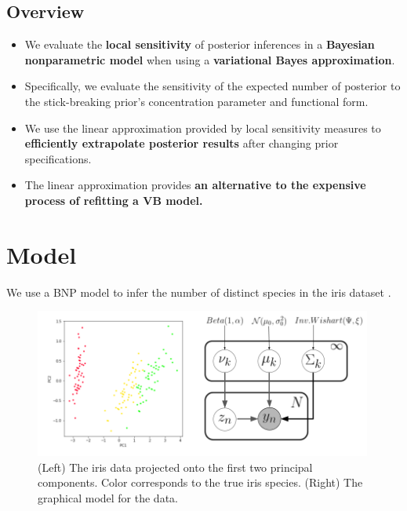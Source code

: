 \documentclass[a0,plainsections]{sciposter}\usepackage[]{graphicx}\usepackage[]{color}
\begin{document}
\begin{minipage}[t]{0.45\textwidth}

\begin{mdframed}[style=MyFrame]
\section*{Overview}
\vspace{-0.3in}
\begin{itemize}
\item We evaluate the {\bf local sensitivity} of posterior inferences in a {\bf Bayesian nonparametric model} when using a {\bf variational Bayes approximation}. 

\item Specifically, we evaluate the sensitivity of the expected number of posterior to the stick-breaking prior's concentration parameter and functional form. 

\item We use the linear approximation provided by local sensitivity measures to {\bf efficiently extrapolate posterior results} after changing prior specifications. 

\item The linear approximation provides {\bf an alternative to the expensive process of refitting a VB model.}

\end{itemize}
\end{mdframed}
\vspace{-0.7in}

\section*{Model}
\vspace{-0.3in}
We use a BNP model to infer the number of distinct species in the iris dataset \cite{iris_data_anderson}. 

\begin{figure}[!h]
\centering
\includegraphics[width = 0.99\textwidth]{./images/BNP_graphical_model2.png}
\vspace{-0.9in}
\caption{(Left) The iris data projected onto the first two principal components. Color corresponds to the true iris species. (Right) The graphical model for the data. }


\end{figure}
\end{minipage}
\end{document}
